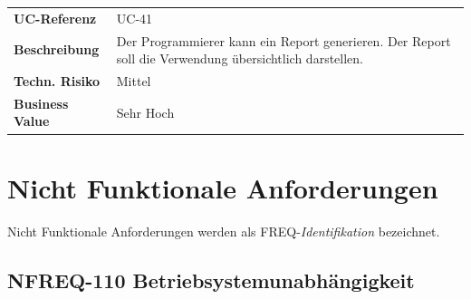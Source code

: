 \begin{longtable}[c]{@{}ll@{}}
\toprule
\begin{minipage}[t]{0.20\columnwidth}\raggedright\strut
\textbf{UC-Referenz}
\strut\end{minipage} &
\begin{minipage}[t]{0.74\columnwidth}\raggedright\strut
UC-41
\strut\end{minipage}\tabularnewline
\begin{minipage}[t]{0.20\columnwidth}\raggedright\strut
\textbf{Beschreibung}
\strut\end{minipage} &
\begin{minipage}[t]{0.74\columnwidth}\raggedright\strut
Der Programmierer kann ein Report generieren. Der Report soll die
Verwendung übersichtlich darstellen.
\strut\end{minipage}\tabularnewline
\begin{minipage}[t]{0.20\columnwidth}\raggedright\strut
\textbf{Techn. Risiko}
\strut\end{minipage} &
\begin{minipage}[t]{0.74\columnwidth}\raggedright\strut
Mittel
\strut\end{minipage}\tabularnewline
\begin{minipage}[t]{0.20\columnwidth}\raggedright\strut
\textbf{Business Value}
\strut\end{minipage} &
\begin{minipage}[t]{0.74\columnwidth}\raggedright\strut
Sehr Hoch
\strut\end{minipage}\tabularnewline
\bottomrule
\end{longtable}

\newpage

\section{Nicht Funktionale
Anforderungen}\label{nicht-funktionale-anforderungen}

Nicht Funktionale Anforderungen werden als FREQ-\emph{Identifikation}
bezeichnet.

\subsection{NFREQ-110
Betriebsystemunabhängigkeit}\label{nfreq-110-betriebsystemunabhuxe4ngigkeit}


